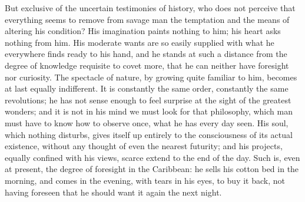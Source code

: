 \documentclass[11pt,twocolumn]{ltugboat}
\begin{document}
But exclusive of the uncertain testimonies of history, who does not
perceive that everything seems to remove from savage man the
temptation and the means of altering his condition? His imagination
paints nothing to him; his heart asks nothing from him. His moderate
wants are so easily supplied with what he everywhere finds ready to
his hand, and he stands at such a distance from the degree of
knowledge requisite to covet more, that he can neither have foresight
nor curiosity. The spectacle of nature, by growing quite familiar to
him, becomes at last equally indifferent. It is constantly the same
order, constantly the same revolutions; he has not sense enough to
feel surprise at the sight of the greatest wonders; and it is not in
his mind we must look for that philosophy, which man must have to know
how to observe once, what he has every day seen. His soul, which
nothing disturbs, gives itself up entirely to the consciousness of its
actual existence, without any thought of even the nearest futurity;
and his projects, equally confined with his views, scarce extend to
the end of the day. Such is, even at present, the degree of foresight
in the Caribbean: he sells his cotton bed in the morning, and comes in
the evening, with tears in his eyes, to buy it back, not having
foreseen that he should want it again the next night.
\end{document}
